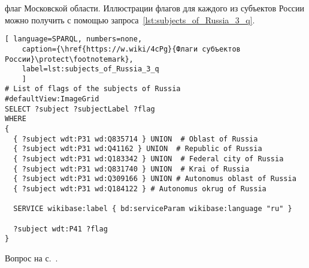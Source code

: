 \begin{task}
\label{answer:subjects_of_Russia_3}
 флаг Московской области. 
    Иллюстрации флагов для каждого из субъектов России 
    можно получить с помощью запроса~\ref{lst:subjects_of_Russia_3_q}.
	
	\begin{lstlisting}[ language=SPARQL, numbers=none,
	caption={\href{https://w.wiki/4cPg}{Флаги субъектов России}\protect\footnotemark},
	label=lst:subjects_of_Russia_3_q
	]
# List of flags of the subjects of Russia
#defaultView:ImageGrid
SELECT ?subject ?subjectLabel ?flag
WHERE
{
  { ?subject wdt:P31 wd:Q835714 } UNION  # Oblast of Russia
  { ?subject wdt:P31 wd:Q41162 } UNION  # Republic of Russia
  { ?subject wdt:P31 wd:Q183342 } UNION  # Federal city of Russia
  { ?subject wdt:P31 wd:Q831740 } UNION  # Krai of Russia
  { ?subject wdt:P31 wd:Q309166 } UNION # Autonomus oblast of Russia
  { ?subject wdt:P31 wd:Q184122 } # Autonomus okrug of Russia
  
  SERVICE wikibase:label { bd:serviceParam wikibase:language "ru" }
   
  ?subject wdt:P41 ?flag
}
\end{lstlisting}
	
\small{Вопрос на с.~\pageref{lst:oblast-of-Russia}.}
\end{task}



